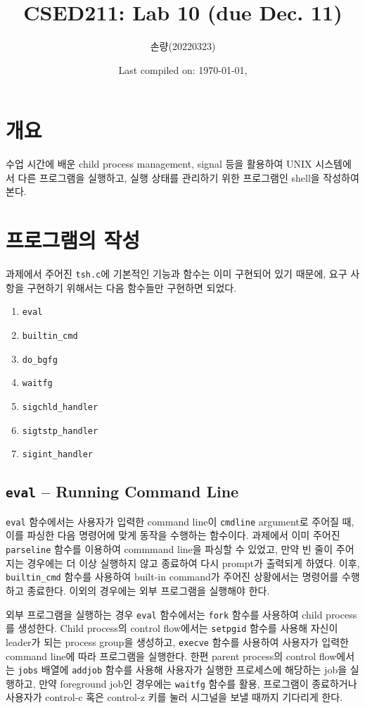 \documentclass{scrartcl}
\title{CSED211: Lab 10 (due Dec. 11)}
\author{손량(20220323)}
\date{Last compiled on: \today, \currenttime}
\begin{document}
\maketitle

\section{개요}
수업 시간에 배운 child process management, signal 등을 활용하여 UNIX 시스템에서
다른 프로그램을 실행하고, 실행 상태를 관리하기 위한 프로그램인 shell을 작성하여
본다.

\section{프로그램의 작성}
과제에서 주어진 \texttt{tsh.c}에 기본적인 기능과 함수는 이미 구현되어 있기
때문에, 요구 사항을 구현하기 위해서는 다음 함수들만 구현하면 되었다.

\begin{enumerate}
  \item \texttt{eval}
  \item \texttt{builtin\_cmd}
  \item \texttt{do\_bgfg}
  \item \texttt{waitfg}
  \item \texttt{sigchld\_handler}
  \item \texttt{sigtstp\_handler}
  \item \texttt{sigint\_handler}
\end{enumerate}

\subsection{\texttt{eval} -- Running Command Line}
\texttt{eval} 함수에서는 사용자가 입력한 command line이 \texttt{cmdline}
argument로 주어질 때, 이를 파싱한 다음 명령어에 맞게 동작을 수행하는 함수이다.
과제에서 이미 주어진 \texttt{parseline} 함수를 이용하여 commmand line을 파싱할
수 있었고, 만약 빈 줄이 주어지는 경우에는 더 이상 실행하지 않고 종료하여 다시
prompt가 출력되게 하였다. 이후, \texttt{builtin\_cmd} 함수를 사용하여 built-in
command가 주어진 상황에서는 명령어를 수행하고 종료한다. 이외의 경우에는 외부
프로그램을 실행해야 한다.

외부 프로그램을 실행하는 경우 \texttt{eval} 함수에서는 \texttt{fork} 함수를
사용하여 child process를 생성한다. Child process의 control flow에서는
\texttt{setpgid} 함수를 사용해 자신이 leader가 되는 process group을 생성하고,
\texttt{execve} 함수를 사용하여 사용자가 입력한 command line에 따라 프로그램을
실행한다. 한편 parent process의 control flow에서는 \texttt{jobs} 배열에
\texttt{addjob} 함수를 사용해 사용자가 실행한 프로세스에 해당하는 job을
실행하고, 만약 foreground job인 경우에는 \texttt{waitfg} 함수를 활용,
프로그램이 종료하거나 사용자가 control-c 혹은 control-z 키를 눌러 시그널을 보낼
때까지 기다리게 한다.
\end{document}
